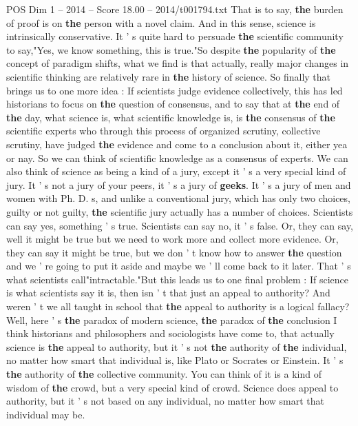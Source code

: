 \begin{textsample}{POS Dim 1 – 2014 – Score 18.00 – 2014/t001794.txt}
That is to say, \textbf{the} burden of proof is on \textbf{the} person with a novel claim.
And in this sense, science is intrinsically conservative.
It ' s quite hard to persuade \textbf{the} scientific community to say,"Yes, we know something, this is true."So despite \textbf{the} popularity of \textbf{the} concept of paradigm shifts, what we find is that actually, really major changes in scientific thinking are relatively rare in \textbf{the} history of science.
So finally that brings us to one more idea : If scientists judge evidence collectively, this has led historians to focus on \textbf{the} question of consensus, and to say that at \textbf{the} end of \textbf{the} day, what science is, what scientific knowledge is, is \textbf{the} consensus of \textbf{the} scientific experts who through this process of organized scrutiny, collective scrutiny, have judged \textbf{the} evidence and come to a conclusion about it, either yea or nay.
So we can think of scientific knowledge as a consensus of experts.
We can also think of science as being a kind of a jury, except it ' s a very special kind of jury.
It ' s not a jury of your peers, it ' s a jury of \textbf{geeks}.
It ' s a jury of men and women with Ph.
D. s, and unlike a conventional jury, which has only two choices, guilty or not guilty, \textbf{the} scientific jury actually has a number of choices.
Scientists can say yes, something ' s true.
Scientists can say no, it ' s false.
Or, they can say, well it might be true but we need to work more and collect more evidence.
Or, they can say it might be true, but we don ' t know how to answer \textbf{the} question and we ' re going to put it aside and maybe we ' ll come back to it later.
That ' s what scientists call"intractable."But this leads us to one final problem : If science is what scientists say it is, then isn ' t that just an appeal to authority?
And weren ' t we all taught in school that \textbf{the} appeal to authority is a logical fallacy?
Well, here ' s \textbf{the} paradox of modern science, \textbf{the} paradox of \textbf{the} conclusion I think historians and philosophers and sociologists have come to, that actually science is \textbf{the} appeal to authority, but it ' s not \textbf{the} authority of \textbf{the} individual, no matter how smart that individual is, like Plato or Socrates or Einstein.
It ' s \textbf{the} authority of \textbf{the} collective community.
You can think of it is a kind of wisdom of \textbf{the} crowd, but a very special kind of crowd.
Science does appeal to authority, but it ' s not based on any individual, no matter how smart that individual may be.

\end{textsample}
